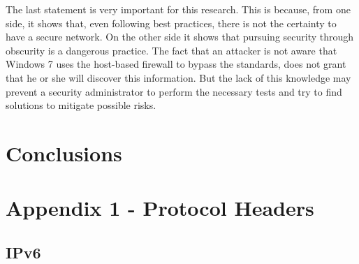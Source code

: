 \documentclass[12pt]{article}
\begin{document}
The last statement is very important for this research. This is because, from one side, it shows that, even following best practices, there is not the certainty to have a secure network. On the other side it shows that pursuing security through obscurity is a dangerous practice. The fact that an attacker is not aware that Windows 7 uses the host-based firewall to bypass the standards, does not grant that he or she will discover this information. But the lack of this knowledge may prevent a security administrator to perform the necessary tests and try to find solutions to mitigate possible risks.

\pagebreak

\section{Conclusions}
\label{sec:7}

\pagebreak








\pagebreak


\appendix

\section{Appendix 1 - Protocol Headers}
\label{Appendix 1}

\subsection*{IPv6}
\end{document}
